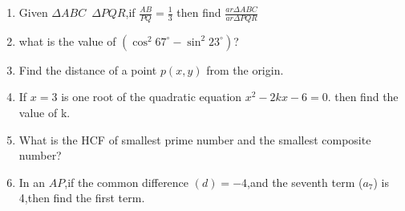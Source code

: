 \documentclass{article}
\begin{document}
\begin{enumerate}
	\item Given $\Delta ABC$~$\Delta PQR$,if $\frac {AB}{PQ}=\frac {1}{3}$ then find $\frac {ar\Delta ABC}{ar\Delta PQR}$
	\item what is the value of $(\cos^2 {67^\circ}-\sin^2{23^\circ})$?
	\item Find the distance of a point $p(x,y)$ from the origin.
	\item If $x=3$ is one root of the quadratic equation $x^2-2kx-6=0$. then find the value of k.
	\item What is the HCF of smallest prime number and the smallest composite number?
	\item In an $AP$,if the common difference $(d)=-4$,and the seventh term ($a_{7}$) is 4,then find the first term. 


\end{enumerate}
\end{document}
